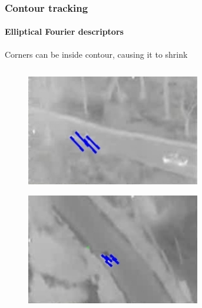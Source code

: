 \begin{frame}
\frametitle{Contour tracking}
\framesubtitle{Elliptical Fourier descriptors}
\logoCSIPCPL\mypagenum
	Corners can be inside contour, causing it to shrink
	\begin{columns}
		\begin{column}{1in}

			\begin{figure}
				\includegraphics[width=1.5\textwidth]{figs/TRK_IGARSS2010_matching_0_30.jpg}
			\end{figure}
			\begin{figure}
				\includegraphics[width=1.5\textwidth]{figs/TRK_IGARSS2010_matching_1250_1277.jpg}
			\end{figure}
		\end{column}
		\begin{column}{1in}
			\begin{figure}

\end{figure}
\end{column}
\end{columns}
\end{frame}
